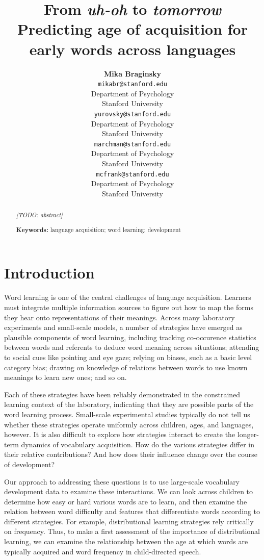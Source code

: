 \documentclass[10pt, letterpaper]{article}
\title{From \emph{uh-oh} to \emph{tomorrow}\\Predicting age of acquisition for
early words across languages}
\author{{\large \bf Mika Braginsky} \\ \texttt{mikabr@stanford.edu} \\ Department of Psychology \\ Stanford University \And {\large \bf Daniel Yurovsky} \\ \texttt{yurovsky@stanford.edu} \\ Department of Psychology \\ Stanford University \And {\large \bf Virginia A. Marchman} \\ \texttt{marchman@stanford.edu} \\ Department of Psychology \\ Stanford University \And {\large \bf Michael C. Frank} \\ \texttt{mcfrank@stanford.edu} \\ Department of Psychology \\ Stanford University}
\begin{document}
\maketitle

\begin{abstract}
\emph{{[}TODO: abstract{]}}

\textbf{Keywords:}
language acquisition; word learning; development
\end{abstract}

\section{Introduction}\label{introduction}

Word learning is one of the central challenges of language acquisition.
Learners must integrate multiple information sources to figure out how
to map the forms they hear onto representations of their meanings.
Across many laboratory experiments and small-scale models, a number of
strategies have emerged as plausible components of word learning,
including tracking co-occurence statistics between words and referents
to deduce word meaning across situations; attending to social cues like
pointing and eye gaze; relying on biases, such as a basic level category
bias; drawing on knowledge of relations between words to use known
meanings to learn new ones; and so on.

Each of these strategies have been reliably demonstrated in the
constrained learning context of the laboratory, indicating that they are
possible parts of the word learning process. Small-scale experimental
studies typically do not tell us whether these strategies operate
uniformly across children, ages, and languages, however. It is also
difficult to explore how strategies interact to create the longer-term
dynamics of vocabulary acquisition. How do the various strategies differ
in their relative contributions? And how does their influence change
over the course of development?

Our approach to addressing these questions is to use large-scale
vocabulary development data to examine these interactions. We can look
across children to determine how easy or hard various words are to
learn, and then examine the relation between word difficulty and
features that differentiate words according to different strategies. For
example, distributional learning strategies rely critically on
frequency. Thus, to make a first assessment of the importance of
distributional learning, we can examine the relationship between the age
at which words are typically acquired and word frequency in
child-directed speech.
\end{document}
